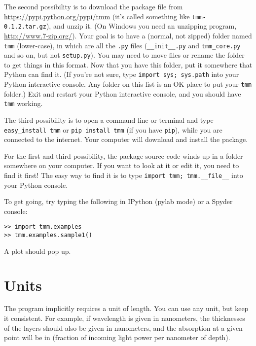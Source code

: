 \documentclass[12pt]{article}
\renewcommand{\(}{\left(}
\renewcommand{\)}{\right)}
\begin{document}
The second possibility is to download the package file from \url{https://pypi.python.org/pypi/tmm} (it's called something like \verb=tmm-0.1.2.tar.gz=), and unzip it. (On Windows you need an unzipping program, \url{http://www.7-zip.org/}). Your goal is to have a (normal, not zipped) folder named \verb=tmm= (lower-case), in which are all the \verb=.py= files (\verb=__init__.py= and \verb=tmm_core.py= and so on, but not \verb=setup.py=). You may need to move files or rename the folder to get things in this format. Now that you have this folder, put it somewhere that Python can find it. (If you're not sure, type \verb=import sys; sys.path= into your Python interactive console. Any folder on this list is an OK place to put your \verb=tmm= folder.) Exit and restart your Python interactive console, and you should have \verb=tmm= working.

The third possibility is to open a command line or terminal and type \verb=easy_install tmm= or \verb=pip install tmm= (if you have \verb=pip=), while you are connected to the internet. Your computer will download and install the package.

For the first and third possibility, the package source code winds up in a folder somewhere on your computer. If you want to look at it or edit it, you need to find it first! The easy way to find it is to type \verb=import tmm; tmm.__file__= into your Python console.

To get going, try typing the following in IPython (pylab mode) or a Spyder console:

\begin{verbatim}
>> import tmm.examples
>> tmm.examples.sample1()
\end{verbatim}

A plot should pop up.

\section{Units}

The program implicitly requires a unit of length. You can use any unit, but keep it consistent. For example, if wavelength is given in nanometers, the thicknesses of the layers should also be given in nanometers, and the absorption at a given point will be in (fraction of incoming light power per nanometer of depth).
\end{document}
